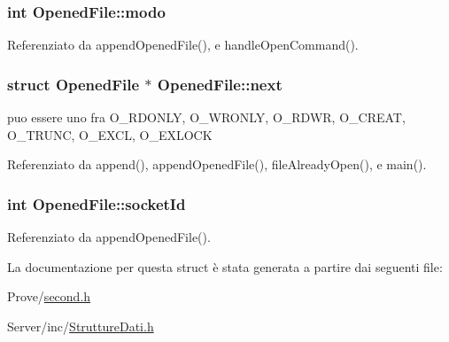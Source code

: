 \hypertarget{structOpenedFile_a6d9f22ff6ba81506ba9c4a60f27c4f32}{}
\subsubsection[{modo}]{\setlength{\rightskip}{0pt plus 5cm}int Opened\+File\+::modo}\label{structOpenedFile_a6d9f22ff6ba81506ba9c4a60f27c4f32}


Referenziato da append\+Opened\+File(), e handle\+Open\+Command().

\hypertarget{structOpenedFile_a9b8c8b995cdda6da249a6ce9a9df98b2}{}
\subsubsection[{next}]{\setlength{\rightskip}{0pt plus 5cm}struct {\bf Opened\+File} $\ast$ Opened\+File\+::next}\label{structOpenedFile_a9b8c8b995cdda6da249a6ce9a9df98b2}


puo\textquotesingle{} essere uno fra O\+\_\+\+R\+D\+O\+N\+L\+Y, O\+\_\+\+W\+R\+O\+N\+L\+Y, O\+\_\+\+R\+D\+W\+R, O\+\_\+\+C\+R\+E\+A\+T, O\+\_\+\+T\+R\+U\+N\+C, O\+\_\+\+E\+X\+C\+L, O\+\_\+\+E\+X\+L\+O\+C\+K 



Referenziato da append(), append\+Opened\+File(), file\+Already\+Open(), e main().

\hypertarget{structOpenedFile_a2af35018ecff06dbd349d464c815038a}{}
\subsubsection[{socket\+Id}]{\setlength{\rightskip}{0pt plus 5cm}int Opened\+File\+::socket\+Id}\label{structOpenedFile_a2af35018ecff06dbd349d464c815038a}


Referenziato da append\+Opened\+File().



La documentazione per questa struct è stata generata a partire dai seguenti file\+:\begin{DoxyCompactItemize}
\item 
Prove/\hyperlink{second_8h}{second.\+h}\item 
Server/inc/\hyperlink{StruttureDati_8h}{Strutture\+Dati.\+h}\end{DoxyCompactItemize}
